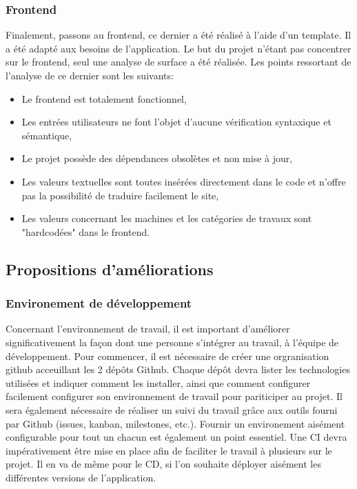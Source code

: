 \documentclass[
    iai, %
    il, %
]{heig-tb}
\begin{document}
\subsubsection{Frontend}
Finalement, passons au frontend, ce dernier a été réalisé à l'aide d'un \Gls{template}. Il a été adapté aux besoins de l'application. Le but du projet n'étant pas concentrer sur le frontend, seul une analyse de surface a été réalisée.\newline
Les points ressortant de l'analyse de ce dernier sont les suivants:
\begin{itemize}
    \item Le frontend est totalement fonctionnel,
    \item Les entrées utilisateurs ne font l'objet d'aucune vérification syntaxique et sémantique,
    \item Le projet possède des dépendances obsolètes et non mise à jour,
    \item Les valeurs textuelles sont toutes insérées directement dans le code et n'offre pas la possibilité de traduire facilement le site,
    \item Les valeurs concernant les machines et les catégories de travaux sont "hardcodées" dans le frontend.
\end{itemize}

\subsection{Propositions d'améliorations}

\subsubsection{Environement de développement}
Concernant l'environnement de travail, il est important d'améliorer significativement la façon dont une personne s'intégrer au travail, à l'équipe de développement.\newline
Pour commencer, il est nécessaire de créer une orgranisation github acceuillant les 2 dépôts Github. Chaque dépôt devra lister les technologies utilisées et indiquer comment les installer, ainsi que comment configurer facilement configurer son environnement de travail pour pariticiper au projet.\newline
Il sera également nécessaire de réaliser un suivi du travail grâce aux outils fourni par Github (issues, kanban, milestones, etc.).\newline
Fournir un environement aisément configurable pour tout un chacun est également un point essentiel.
Une CI devra impérativement être mise en place afin de faciliter le travail à plusieurs sur le projet. Il en va de même pour le CD, si l'on souhaite déployer aisément les différentes versions de l'application.
\end{document}
